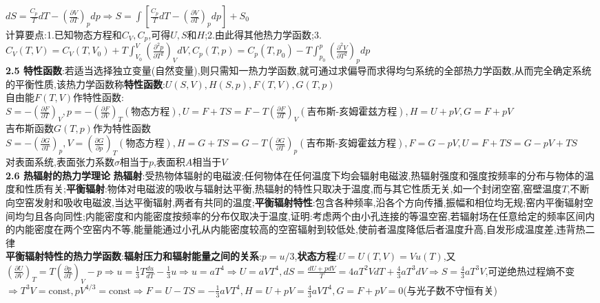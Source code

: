 \documentclass[10pt,a4paper]{article}
\begin{document}
\begin{multicols}{2}
$dS=\frac{C_p}{T}dT-\left(\frac{\partial V}{\partial T}\right)_pdp\Rightarrow S=\int\left[\frac{C_p}{T}dT-\left(\frac{\partial V}{\partial T}\right)_pdp\right]+S_0$\\
计算要点:1.已知物态方程和$C_V,C_p$,可得$U,S$和$H$;2.由此得其他热力学函数;3.$C_V(T,V)=C_V(T,V_0)+T\int_{V_0}^V\left(\frac{\partial^2p}{\partial T^2}\right)_VdV,C_p(T,p)=C_p(T,p_0)-T\int_{p_0}^p\left(\frac{\partial^2V}{\partial T^2}\right)_pdp$\\
\textbf{2.5 特性函数}:若适当选择独立变量(自然变量),则只需知一热力学函数,就可通过求偏导而求得均匀系统的全部热力学函数,从而完全确定系统的平衡性质,该热力学函数称\textbf{特性函数}:$U(S,V),H(S,p),F(T,V),G(T,p)$\\
自由能$F(T,V)$作特性函数:$S=-\left(\frac{\partial F}{\partial T}\right)_V,p=-\left(\frac{\partial F}{\partial V}\right)_T(\text{物态方程}),U=F+TS=F-T\left(\frac{\partial F}{\partial T}\right)_V(\text{吉布斯-亥姆霍兹方程}),H=U+pV,G=F+pV$\\
吉布斯函数$G(T,p)$作为特性函数$S=-\left(\frac{\partial G}{\partial T}\right)_p,V=\left(\frac{\partial G}{\partial p}\right)_T(\text{物态方程}),H=G+TS=G-T\left(\frac{\partial G}{\partial T}\right)_p(\text{吉布斯-亥姆霍兹方程}),F=G-pV,U=F+TS=G-pV+TS$\\
对表面系统,表面张力系数$\sigma$相当于$p$,表面积$A$相当于$V$\\
\textbf{2.6 热辐射的热力学理论}
\textbf{热辐射}:受热物体辐射的电磁波;任何物体在任何温度下均会辐射电磁波,热辐射强度和强度按频率的分布与物体的温度和性质有关;\textbf{平衡辐射}:物体对电磁波的吸收与辐射达平衡,热辐射的特性只取决于温度,而与其它性质无关,如一个封闭空窑,窑壁温度$T$,不断向空窑发射和吸收电磁波,当达平衡辐射,两者有共同的温度;\textbf{平衡辐射特性}:包含各种频率,沿各个方向传播,振幅和相位均无规;窑内平衡辐射空间均匀且各向同性;内能密度和内能密度按频率的分布仅取决于温度,证明:考虑两个由小孔连接的等温空窑,若辐射场在任意给定的频率区间内的内能密度在两个空窑内不等,能量能通过小孔从内能密度较高的空窑辐射到较低处,使前者温度降低后者温度升高,自发形成温度差,违背热二律\\
\textbf{平衡辐射特性的热力学函数}:\textbf{辐射压力和辐射能量之间的关系}:$p=u/3$,\textbf{状态方程}:$U=U(T,V)=Vu(T)$,又$\left(\frac{\partial U}{\partial V}\right)_T=T\left(\frac{\partial p}{\partial T}\right)_V-p\Rightarrow u=\frac{1}{3}T\frac{du}{dT}-\frac{1}{3}u\Rightarrow u=aT^4\Rightarrow U=aVT^4,dS=\frac{dU+pdV}{T}=4aT^2VdT+\frac{4}{3}aT^3dV\Rightarrow S=\frac{4}{3}aT^3V$,可逆绝热过程熵不变$\Rightarrow T^3V=\text{const},pV^{4/3}=\text{const}\Rightarrow F=U-TS=-\frac{1}{3}aVT^4,H=U+pV=\frac{4}{3}aVT^4,G=F+pV=0$(与光子数不守恒有关)\\

\end{multicols}
\end{document}
